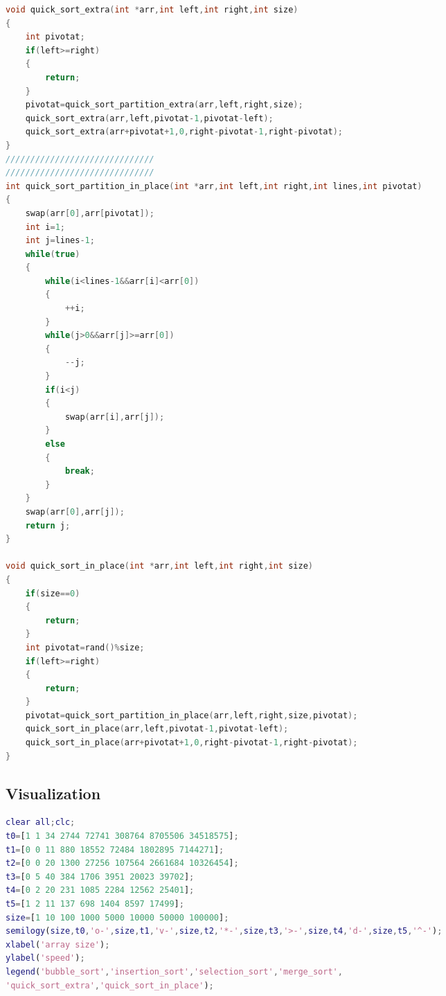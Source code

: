 \documentclass{article}
\begin{document}
\begin{spacing}{2.0}
\begin{lstlisting}[language=c++]
void quick_sort_extra(int *arr,int left,int right,int size)
{
    int pivotat;
    if(left>=right)
    {
        return;
    }
    pivotat=quick_sort_partition_extra(arr,left,right,size);
    quick_sort_extra(arr,left,pivotat-1,pivotat-left);
    quick_sort_extra(arr+pivotat+1,0,right-pivotat-1,right-pivotat);
}
//////////////////////////////
//////////////////////////////
int quick_sort_partition_in_place(int *arr,int left,int right,int lines,int pivotat)
{
    swap(arr[0],arr[pivotat]);
    int i=1;
    int j=lines-1;
    while(true)
    {
        while(i<lines-1&&arr[i]<arr[0])
        {
            ++i;
        }
        while(j>0&&arr[j]>=arr[0])
        {
            --j;
        }
        if(i<j)
        {
            swap(arr[i],arr[j]);
        }
        else
        {
            break;
        }
    }
    swap(arr[0],arr[j]);
    return j;
}

void quick_sort_in_place(int *arr,int left,int right,int size)
{
    if(size==0)
    {
        return;
    }
    int pivotat=rand()%size;
    if(left>=right)
    {
        return;
    }
    pivotat=quick_sort_partition_in_place(arr,left,right,size,pivotat);
    quick_sort_in_place(arr,left,pivotat-1,pivotat-left);
    quick_sort_in_place(arr+pivotat+1,0,right-pivotat-1,right-pivotat);
}

\end{lstlisting}
\subsection{Visualization}
\begin{lstlisting}[language=Matlab]
clear all;clc;
t0=[1 1 34 2744 72741 308764 8705506 34518575];
t1=[0 0 11 880 18552 72484 1802895 7144271];
t2=[0 0 20 1300 27256 107564 2661684 10326454];
t3=[0 5 40 384 1706 3951 20023 39702];
t4=[0 2 20 231 1085 2284 12562 25401];
t5=[1 2 11 137 698 1404 8597 17499];
size=[1 10 100 1000 5000 10000 50000 100000];
semilogy(size,t0,'o-',size,t1,'v-',size,t2,'*-',size,t3,'>-',size,t4,'d-',size,t5,'^-');
xlabel('array size');
ylabel('speed');
legend('bubble_sort','insertion_sort','selection_sort','merge_sort',
'quick_sort_extra','quick_sort_in_place');
\end{lstlisting}
\end{spacing}
\end{document}
